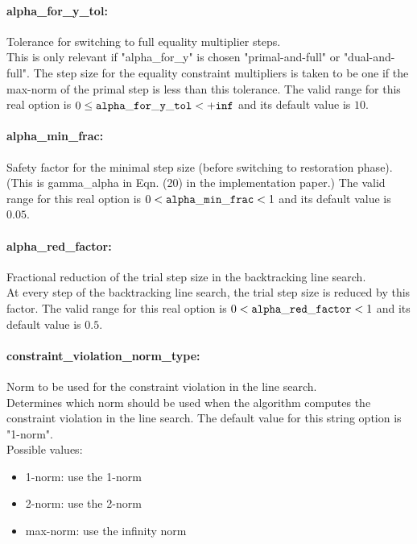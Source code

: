 \paragraph{alpha\_for\_y\_tol:}\label{sec:alpha_for_y_tol} Tolerance for switching to full equality multiplier steps. $\;$ \\
 This is only relevant if "alpha\_for\_y" is
chosen "primal-and-full" or "dual-and-full".  The
step size for the equality constraint multipliers
is taken to be one if the max-norm of the primal
step is less than this tolerance. The valid range for this real option is 
$0 \le {\tt alpha\_for\_y\_tol } <  {\tt +inf}$
and its default value is $10$.


\paragraph{alpha\_min\_frac:}\label{sec:alpha_min_frac} Safety factor for the minimal step size (before switching to restoration phase). $\;$ \\
 (This is gamma\_alpha in Eqn. (20) in the
implementation paper.) The valid range for this real option is 
$0 <  {\tt alpha\_min\_frac } <  1$
and its default value is $0.05$.


\paragraph{alpha\_red\_factor:}\label{sec:alpha_red_factor} Fractional reduction of the trial step size in the backtracking line search. $\;$ \\
 At every step of the backtracking line search,
the trial step size is reduced by this factor. The valid range for this real option is 
$0 <  {\tt alpha\_red\_factor } <  1$
and its default value is $0.5$.


\paragraph{constraint\_violation\_norm\_type:}\label{sec:constraint_violation_norm_type} Norm to be used for the constraint violation in the line search. $\;$ \\
 Determines which norm should be used when the
algorithm computes the constraint violation in
the line search.
The default value for this string option is "1-norm".
\\ 
Possible values:
\begin{itemize}
   \item 1-norm: use the 1-norm
   \item 2-norm: use the 2-norm
   \item max-norm: use the infinity norm
\end{itemize}

